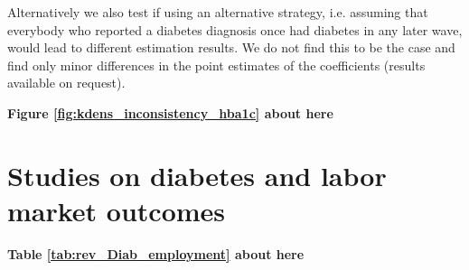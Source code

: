 \documentclass[12pt,english]{article}
\begin{document}
\begin{appendix}
Alternatively we also test if using an alternative strategy, i.e. assuming that everybody who reported  a diabetes diagnosis once had diabetes in any later wave, would lead to different estimation results. We do not find this to be the case and find only minor differences in the point estimates of the coefficients (results available on request). 

\begin{center}
	\textbf{Figure \ref{fig:kdens_inconsistency_hba1c} about here}
\end{center}


\section{\label{sec:Appendix_B}Studies on diabetes and labor market outcomes}
\begin{center}
	\textbf{Table \ref{tab:rev_Diab_employment} about here}
\end{center}



\end{appendix}




\printbibliography
\end{document}
